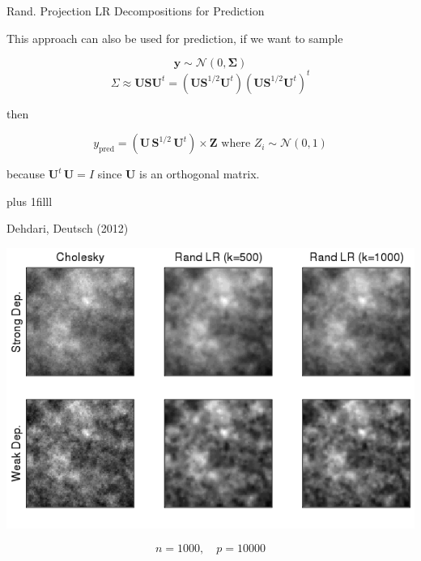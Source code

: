 \documentclass[11pt,ignorenonframetext,]{beamer}
\newcommand{\vvfill}{\vskip0pt plus 1filll}
\begin{document}
\begin{frame}[t]{Rand. Projection LR Decompositions for Prediction}

\small

This approach can also be used for prediction, if we want to sample

\[\bm{y} \sim \mathcal{N}(0,\bm{\Sigma})\] \[
\Sigma \approx \bm{U} \bm{S} \bm{U}^t = (\bm{U} \bm{S}^{1/2} \bm{U}^t)(\bm{U} \bm{S}^{1/2} \bm{U}^t)^t 
\]

then

\[
y_{\text{pred}} = (\bm{U}\, \bm{S}^{1/2}\,\bm{U}^t) \times \bm{Z} \text{ where } Z_i \sim \mathcal{N}(0,1)
\]

because \(\bm{U}^t \, \bm{U} = I\) since \(\bm{U}\) is an orthogonal
matrix.

\vvfill

\begin{center}
\footnotesize
Dehdari, Deutsch (2012)
\end{center}

\end{frame}

\begin{frame}{}

\vspace{5mm}

\begin{center}
\includegraphics[width=\textwidth]{figs/RandLRPred.png}
\end{center}

\[ n=1000, \quad p=10000 \]

\end{frame}
\end{document}
